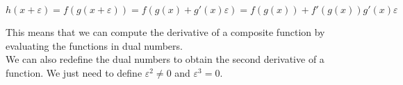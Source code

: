 \begin{equation}
    h(x + \varepsilon) = f(g(x + \varepsilon)) = f(g(x) + g'(x) \varepsilon) = f(g(x)) + f'(g(x)) g'(x) \varepsilon
\end{equation}

This means that we can compute the derivative of a composite function by evaluating the functions 
in dual numbers.\\

We can also redefine the dual numbers to obtain the second derivative of a function. We just need to
define $\varepsilon^2 \neq 0$ and $\varepsilon^3 = 0$. 
